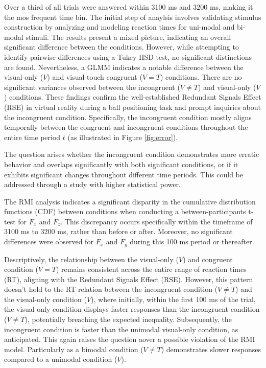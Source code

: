 \documentclass[12pt,oneside,openright]{report}
\begin{document}
Over a third of all trials were answered within 3100 ms and 3200 ms, making it the mos frequent time bin. The initial step of anaylsis involves validating stimulus construction by analyzing and modeling reaction times for uni-modal and bi-modal stimuli. The results present a mixed picture, indicating an overall significant difference between the conditions. However, while attempting to identify pairwise differences using a Tukey HSD test, no significant distinctions are found. Nevertheless, a GLMM indicates a notable difference between the visual-only ($V$) and visual-touch congruent ($V=T$) conditions. There are no significant variances observed between the incongruent ($V \neq T$) and visual-only ($V$) conditions. These findings confirm the well-established Redundant Signals Effect (RSE) in virtual reality during a ball positioning task and prompt inquiries about the incongruent condition. Specifically, the incongruent condition mostly aligns temporally between the congruent and incongruent conditions throughout the entire time period $t$ (as illustrated in Figure \ref{fig:error}).

The question arises whether the incongruent condition demonstrates more erratic behavior and overlaps significantly with both significant conditions, or if it exhibits significant changes throughout different time periods. This could be addressed through a study with higher statistical power.

The RMI analysis indicates a significant disparity in the cumulative distribution functions (CDF) between conditions when conducting a between-participants t-test for $F_x$ and $F_z$. This discrepancy occurs specifically within the timeframe of 3100 ms to 3200 ms, rather than before or after. Moreover, no significant differences were observed for $F_x$ and $F_y$ during this 100 ms period or thereafter. 

Descriptively, the relationship between the visual-only ($V$) and congruent condition ($V=T$) remains consistent across the entire range of reaction times (RT), aligning with the Redundant Signals Effect (RSE). However, this pattern doesn’t hold to the RT relation between the incongruent condition ($V \neq T$) and the visual-only condition ($V$), where initially, within the first 100 ms of the trial, the visual-only condition displays faster responses than the incongruent condition ($V \neq T$), potentially breaching the expected inequality. Subsequently, the incongruent condition is faster than the unimodal visual-only condition, as anticipated. This again raises the question aover a possible violation of the RMI model. Particularly as a bimodal condition ($V \neq T$) demonstrates slower responses compared to a unimodal condition ($V$).
\end{document}
